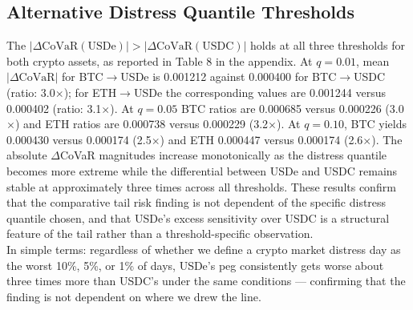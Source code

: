\documentclass[12pt,a4paper,titlepage,oneside,english]{article}
\begin{document}
\subsection{Alternative Distress Quantile Thresholds}
The $|\Delta\text{CoVaR}(\text{USDe})| > |\Delta\text{CoVaR}(\text{USDC})|$ holds at all three thresholds for both crypto assets, as reported
in Table 8 in the appendix. At $q = 0.01$, mean $|\Delta\text{CoVaR}|$ for BTC$\to$USDe is 0.001212 against 0.000400 for BTC$\to$USDC (ratio: 3.0$\times$); for
ETH$\to$USDe the corresponding values are 0.001244 versus 0.000402 (ratio:
3.1$\times$). At $q = 0.05$ BTC ratios are 0.000685 versus 0.000226 (3.0$\times$) and ETH ratios are 0.000738 versus
0.000229 (3.2$\times$). At $q = 0.10$, BTC yields 0.000430 versus 0.000174
(2.5$\times$) and ETH 0.000447 versus 0.000174 (2.6$\times$). The absolute
$\Delta$CoVaR magnitudes increase monotonically as the distress quantile
becomes more extreme while the differential between USDe and USDC remains stable at approximately three times across all thresholds. These results confirm that the comparative tail risk finding is not dependent of the specific distress quantile chosen, and that USDe's excess sensitivity over USDC is a structural feature of the tail rather than a threshold-specific observation.\\

In simple terms: regardless of whether we define a crypto market distress
day as the worst 10\%, 5\%, or 1\% of days, USDe's peg consistently
gets worse about three times more than USDC's under the same conditions —
confirming that the finding is not dependent on where we drew the line.
\end{document}
